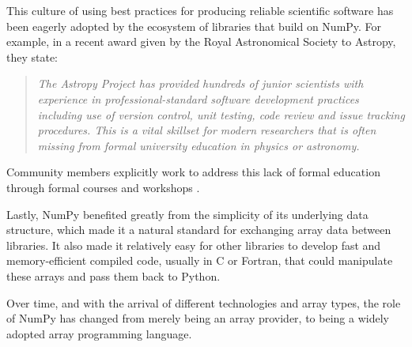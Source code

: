This culture of using best practices for producing reliable scientific software has been eagerly adopted by the ecosystem of libraries that build on NumPy.  For example, in a recent award given by the Royal Astronomical Society to Astropy, they state:
\begin{quotation}
\noindent\emph{The Astropy Project has provided hundreds of junior scientists with experience in professional-standard software development practices including use of version control, unit testing, code review and issue tracking procedures. This is a vital skillset for modern researchers that is often missing from formal university education in physics or astronomy.}
\end{quotation}
Community members explicitly work to address this lack of formal education
through formal courses and workshops
\cite{wilson-software-carpentry,hannay-scientific-software-survey,millman2018teaching}.

Lastly, NumPy benefited greatly from the simplicity of its underlying data structure, which made it a natural standard for exchanging array data between libraries.  It also made it relatively easy for other
libraries to develop fast and memory-efficient compiled code, usually in C or
Fortran, that could manipulate these arrays and pass them back to Python.

Over time, and with the arrival of different technologies and array types, the role of NumPy has changed from merely being an array provider, to being a widely adopted array programming language.


%
%
%
%
%
%

